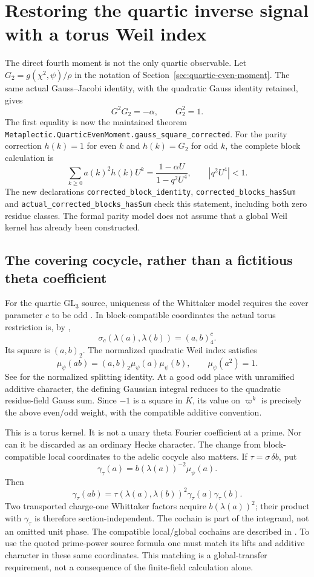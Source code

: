 \documentclass[11pt]{article}
\begin{document}
\section{Restoring the quartic inverse signal with a torus Weil index}
\label{sec:quartic-weil-inverse}

The direct fourth moment is not the only quartic observable.
Let $G_2=g(\chi^2,\psi)/\rho$ in the notation of
Section~\ref{sec:quartic-even-moment}. The same actual Gauss--Jacobi
identity, with the quadratic Gauss identity retained, gives
\[
 G^2G_2=-\alpha,\qquad G_2^2=1.
\]
The first equality is now the maintained theorem
\texttt{Metaplectic.QuarticEvenMoment.gauss\_square\_corrected}.
For the parity correction $h(k)=1$ for even $k$ and $h(k)=G_2$ for odd
$k$, the complete block calculation is
\[
 \sum_{k\ge0}a(k)^2h(k)U^k
   =\frac{1-\alpha U}{1-q^2U^4},
 \qquad |q^2U^4|<1.
\]
The new declarations \texttt{corrected\_block\_identity},
\texttt{corrected\_blocks\_hasSum} and
\texttt{actual\_corrected\_blocks\_hasSum} check this statement, including
both zero residue classes. The formal parity model does not assume that
a global Weil kernel has already been constructed.

\subsection{The covering cocycle, rather than a fictitious theta coefficient}
For the quartic $\mathrm{GL}_3$ source, uniqueness of the Whittaker
model requires the cover parameter $c$ to be odd
\cite[\S2]{FGGlobal}. In block-compatible coordinates the actual
torus restriction is, by \cite[Proposition 2.1(v)]{TakedaTensor},
\[
 \sigma_c(\lambda(a),\lambda(b))=(a,b)_4^c .
\]
Its square is $(a,b)_2$. The normalized quadratic Weil index satisfies
\[
 \mu_\psi(ab)=(a,b)_2\mu_\psi(a)\mu_\psi(b),\qquad
 \mu_\psi(a^2)=1 .
\]
See \cite[\S2.1]{PrasannaWeil} for the normalized splitting identity.
At a good odd place with unramified additive character, the defining
Gaussian integral reduces to the quadratic residue-field Gauss sum.
Since $-1$ is a square in $K$, its value on $\varpi^k$ is precisely
the above even/odd weight, with the compatible additive convention.

This is a torus kernel. It is not a unary theta Fourier coefficient at
a prime. Nor can it be discarded as an ordinary Hecke character.
The change from block-compatible local coordinates to the adelic
cocycle also matters. If $\tau=\sigma\,\delta b$, put
\[
 \gamma_\tau(a)=b(\lambda(a))^{-2}\mu_\psi(a).
\]
Then
\[
 \gamma_\tau(ab)=\tau(\lambda(a),\lambda(b))^2
                   \gamma_\tau(a)\gamma_\tau(b).
\]
Two transported charge-one Whittaker factors acquire $b(\lambda(a))^2$;
their product with $\gamma_\tau$ is therefore section-independent.
The cochain is part of the integrand, not an omitted unit phase.
The compatible local/global cochains are described in
\cite[\S\S2.1,3.2]{TakedaTensor}. To use the quoted prime-power source
formula one must match its lifts and additive character in these same
coordinates. This matching is a global-transfer requirement, not a
consequence of the finite-field calculation alone.
\end{document}

